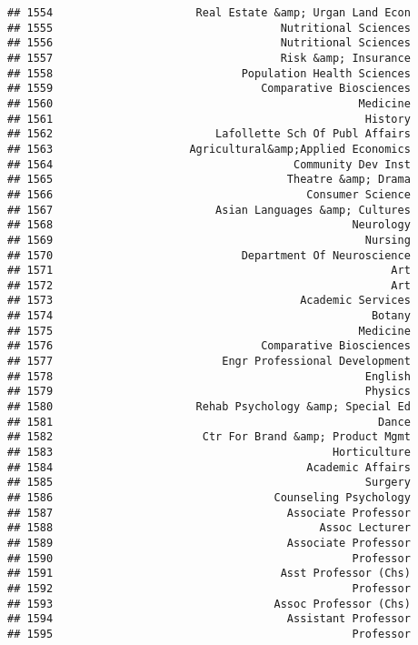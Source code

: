\documentclass[
]{article}
\begin{document}
\begin{verbatim}
## 1554                      Real Estate &amp; Urgan Land Econ
## 1555                                   Nutritional Sciences
## 1556                                   Nutritional Sciences
## 1557                                   Risk &amp; Insurance
## 1558                             Population Health Sciences
## 1559                                Comparative Biosciences
## 1560                                               Medicine
## 1561                                                History
## 1562                         Lafollette Sch Of Publ Affairs
## 1563                     Agricultural&amp;Applied Economics
## 1564                                     Community Dev Inst
## 1565                                    Theatre &amp; Drama
## 1566                                       Consumer Science
## 1567                         Asian Languages &amp; Cultures
## 1568                                              Neurology
## 1569                                                Nursing
## 1570                             Department Of Neuroscience
## 1571                                                    Art
## 1572                                                    Art
## 1573                                      Academic Services
## 1574                                                 Botany
## 1575                                               Medicine
## 1576                                Comparative Biosciences
## 1577                          Engr Professional Development
## 1578                                                English
## 1579                                                Physics
## 1580                      Rehab Psychology &amp; Special Ed
## 1581                                                  Dance
## 1582                       Ctr For Brand &amp; Product Mgmt
## 1583                                           Horticulture
## 1584                                       Academic Affairs
## 1585                                                Surgery
## 1586                                  Counseling Psychology
## 1587                                    Associate Professor
## 1588                                         Assoc Lecturer
## 1589                                    Associate Professor
## 1590                                              Professor
## 1591                                   Asst Professor (Chs)
## 1592                                              Professor
## 1593                                  Assoc Professor (Chs)
## 1594                                    Assistant Professor
## 1595                                              Professor

\end{verbatim}
\end{document}
